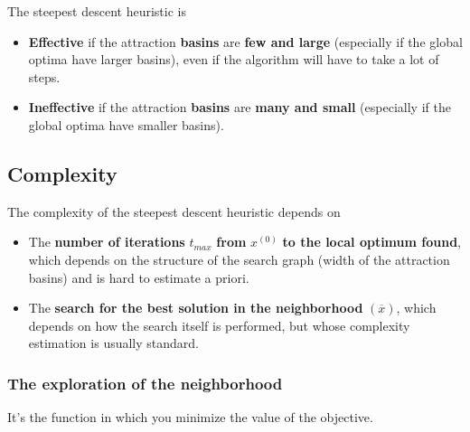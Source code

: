 The steepest descent heuristic is
\begin{itemize}
	\item \textbf{Effective} if the attraction \textbf{basins} are \textbf{few and large} (especially if the global optima have larger basins), even if the algorithm will have to take a lot of steps.\\
	
	\item \textbf{Ineffective} if the attraction \textbf{basins} are \textbf{many and small} (especially if the global optima have smaller basins).\\
\end{itemize}


\newpage

\subsection{Complexity}
The complexity of the steepest descent heuristic depends on
\begin{itemize}
	\item The \textbf{number of iterations} $t_{max}$ \textbf{from} $x^{(0)}$ \textbf{to the local optimum found}, which depends on the structure of the search graph (width of the attraction basins) and is hard to estimate a priori.\\
	
	\item The \textbf{search for the best solution in the neighborhood} $(\overline{x})$, which depends on how the search itself is performed, but whose complexity estimation is usually standard.\\
\end{itemize}

\subsubsection{The exploration of the neighborhood}
It's the function in which you minimize the value of the objective.\\


